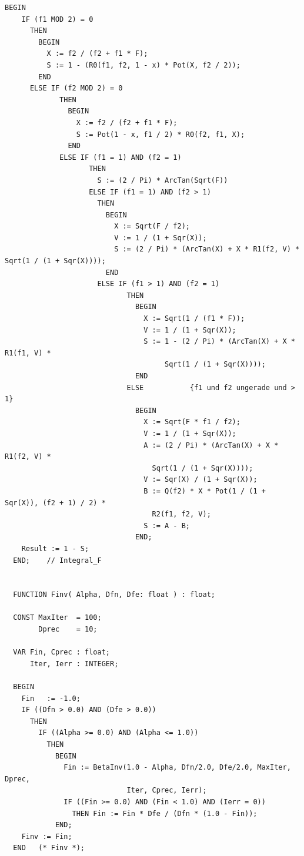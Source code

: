 \begin{refsection}
\begin{lstlisting}[caption=Routines for the F-Distribution]
  BEGIN
    IF (f1 MOD 2) = 0
      THEN
        BEGIN
          X := f2 / (f2 + f1 * F);
          S := 1 - (R0(f1, f2, 1 - x) * Pot(X, f2 / 2));
        END
      ELSE IF (f2 MOD 2) = 0
             THEN
               BEGIN
                 X := f2 / (f2 + f1 * F);
                 S := Pot(1 - x, f1 / 2) * R0(f2, f1, X);
               END
             ELSE IF (f1 = 1) AND (f2 = 1)
                    THEN
                      S := (2 / Pi) * ArcTan(Sqrt(F))
                    ELSE IF (f1 = 1) AND (f2 > 1)
                      THEN
                        BEGIN
                          X := Sqrt(F / f2);
                          V := 1 / (1 + Sqr(X));
                          S := (2 / Pi) * (ArcTan(X) + X * R1(f2, V) * Sqrt(1 / (1 + Sqr(X))));
                        END
                      ELSE IF (f1 > 1) AND (f2 = 1)
                             THEN
                               BEGIN
                                 X := Sqrt(1 / (f1 * F));
                                 V := 1 / (1 + Sqr(X));
                                 S := 1 - (2 / Pi) * (ArcTan(X) + X * R1(f1, V) *
                                      Sqrt(1 / (1 + Sqr(X))));
                               END
                             ELSE           {f1 und f2 ungerade und > 1}
                               BEGIN
                                 X := Sqrt(F * f1 / f2);
                                 V := 1 / (1 + Sqr(X));
                                 A := (2 / Pi) * (ArcTan(X) + X * R1(f2, V) *
                                   Sqrt(1 / (1 + Sqr(X))));
                                 V := Sqr(X) / (1 + Sqr(X));
                                 B := Q(f2) * X * Pot(1 / (1 + Sqr(X)), (f2 + 1) / 2) *
                                   R2(f1, f2, V);
                                 S := A - B;
                               END;
    Result := 1 - S;
  END;    // Integral_F


  FUNCTION Finv( Alpha, Dfn, Dfe: float ) : float;

  CONST MaxIter  = 100;
        Dprec    = 10;

  VAR Fin, Cprec : float;
      Iter, Ierr : INTEGER;

  BEGIN
    Fin   := -1.0;
    IF ((Dfn > 0.0) AND (Dfe > 0.0))
      THEN
        IF ((Alpha >= 0.0) AND (Alpha <= 1.0))
          THEN
            BEGIN
              Fin := BetaInv(1.0 - Alpha, Dfn/2.0, Dfe/2.0, MaxIter, Dprec,
                             Iter, Cprec, Ierr);
              IF ((Fin >= 0.0) AND (Fin < 1.0) AND (Ierr = 0))
                THEN Fin := Fin * Dfe / (Dfn * (1.0 - Fin));
            END;
    Finv := Fin;
  END   (* Finv *);
\end{lstlisting}


\end{refsection}
